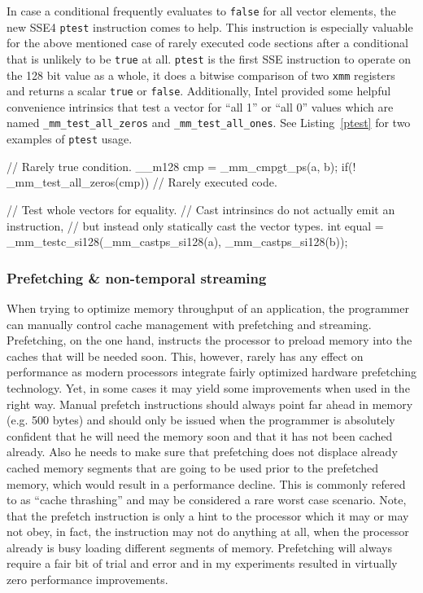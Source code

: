 In case a conditional frequently evaluates to \texttt{false} for all vector elements, the new SSE4 \texttt{ptest} instruction comes to help. This instruction is especially valuable for the above mentioned case of rarely executed code sections after a conditional that is unlikely to be \texttt{true} at all. \texttt{ptest} is the first SSE instruction to operate on the 128 bit value as a whole, it does a bitwise comparison of two \texttt{xmm} registers and returns a scalar \texttt{true} or \texttt{false}. Additionally, Intel provided some helpful convenience intrinsics that test a vector for ``all 1'' or ``all 0'' values which are named \texttt{\_mm\_test\_all\_zeros} and \texttt{\_mm\_test\_all\_ones}. See Listing~\ref{ptest} for two examples of \texttt{ptest} usage.

\begin{code}[caption={Examples of \texttt{ptest} usage},label=ptest]
// Rarely true condition.
__m128 cmp = _mm_cmpgt_ps(a, b);
if(! _mm_test_all_zeros(cmp)) {
  // Rarely executed code.
}

// Test whole vectors for equality.
// Cast intrinsincs do not actually emit an instruction,
// but instead only statically cast the vector types.
int equal = _mm_testc_si128(_mm_castps_si128(a), _mm_castps_si128(b));
\end{code}

\subsubsection{Prefetching \& non-temporal streaming}

When trying to optimize memory throughput of an application, the programmer can manually control cache management with prefetching and streaming. Prefetching, on the one hand, instructs the processor to preload memory into the caches that will be needed soon. This, however, rarely has any effect on performance as modern processors integrate fairly optimized hardware prefetching technology. Yet, in some cases it may yield some improvements when used in the right way. Manual prefetch instructions should always point far ahead in memory (e.g. 500 bytes) and should only be issued when the programmer is absolutely confident that he will need the memory soon and that it has not been cached already. Also he needs to make sure that prefetching does not displace already cached memory segments that are going to be used prior to the prefetched memory, which would result in a performance decline. This is commonly refered to as ``cache thrashing'' and may be considered a rare worst case scenario. Note, that the prefetch instruction is only a hint to the processor which it may or may not obey, in fact, the instruction may not do anything at all, when the processor already is busy loading different segments of memory. Prefetching will always require a fair bit of trial and error and in my experiments resulted in virtually zero performance improvements.

